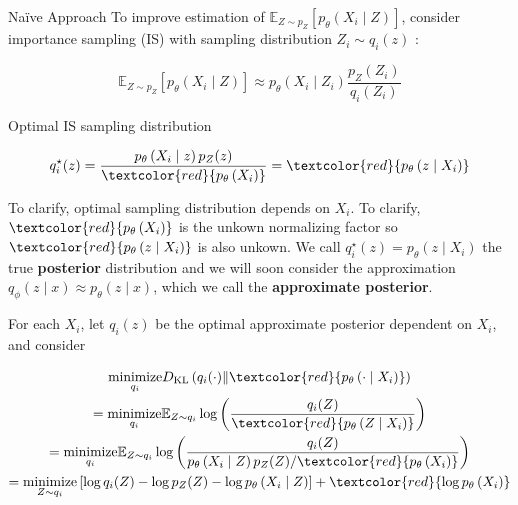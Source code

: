 \begin{frame}[allowframebreaks]

\begin{myconceptblock}{11.9}{Naïve Approach}
    To improve estimation of $\mathbb{E}_{Z \sim p_{Z}}\left[p_{\theta}\left(X_{i} \mid Z\right)\right]$, consider importance sampling (IS) with sampling distribution $Z_{i} \sim q_{i}(z)$ :

    $$
    \mathbb{E}_{Z \sim p_{Z}}\left[p_{\theta}\left(X_{i} \mid Z\right)\right] \approx p_{\theta}\left(X_{i} \mid Z_{i}\right) \frac{p_{Z}\left(Z_{i}\right)}{q_{i}\left(Z_{i}\right)}
    $$

    Optimal IS sampling distribution

    $$
    q_{i}^{\star}(z)=\frac{p_{\theta}\left(X_{i} \mid z\right) p_{Z}(z)}{\textcolor{red}{p_{\theta}\left(X_{i}\right)}}=\textcolor{red}{p_{\theta}\left(z \mid X_{i}\right)}
    $$

    To clarify, optimal sampling distribution depends on $X_{i}$.
    To clarify, $\textcolor{red}{p_{\theta}\left(X_{i}\right)}$ is the unkown normalizing factor so $\textcolor{red}{p_{\theta}\left(z \mid X_{i}\right)}$ is also unkown.
    We call $q_{i}^{\star}(z)=p_{\theta}\left(z \mid X_{i}\right)$ the true \textbf{posterior} distribution and we will soon consider the approximation $q_{\phi}(z \mid x) \approx p_{\theta}(z \mid x)$, which we call the \textbf{approximate posterior}.

    \par\noindent\textcolor{gray}{\hdashrule{\textwidth}{0.4pt}{1pt 2pt}}

    For each $X_{i}$, let $q_i(z)$ be the optimal approximate posterior dependent on $X_i$, and consider

    $$
    \begin{gathered}
    \underset{q_{i}}{\operatorname{minimize}} D_{\mathrm{KL}}\left(q_{i}(\cdot) \| \textcolor{red}{p_{\theta}\left(\cdot \mid X_{i}\right)} \right)\\
    =\underset{q_{i}}{\operatorname{minimize}} \mathbb{E}_{Z \sim q_{i}} \log \left(\frac{q_{i}(Z)}{\textcolor{red}{p_{\theta}\left(Z \mid X_{i}\right)}}\right) \\
    =\underset{q_{i}}{\operatorname{minimize}} \mathbb{E}_{Z \sim q_{i}} \log \left(\frac{q_{i}(Z)}{p_{\theta}\left(X_{i} \mid Z\right) p_{Z}(Z) / \textcolor{red}{p_{\theta}\left(X_{i}\right)}}\right) \\
    =\underset{Z \sim q_{i}}{\operatorname{minimize}}\left[\log q_{i}(Z)-\log p_{Z}(Z)-\log p_{\theta}\left(X_{i} \mid Z\right)\right]+\textcolor{red}{\log p_{\theta}\left(X_{i}\right)}
    \end{gathered}
    $$


\end{myconceptblock}
\end{frame}
